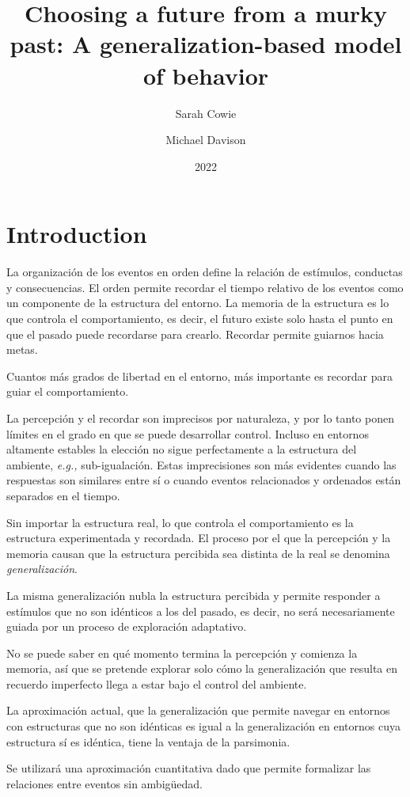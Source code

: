 \documentclass[a4paper,12pt]{article}
\title{Choosing a future from a murky past: A generalization-based model of behavior}
\author{Sarah Cowie \and Michael Davison}
\date{2022}
\begin{document}
{\scshape\bfseries \maketitle}

\section{Introduction}

La organización de los eventos en orden define la relación de estímulos, conductas y consecuencias. El orden permite recordar el tiempo relativo de los eventos como un componente de la estructura del entorno. La memoria de la estructura es lo que controla el comportamiento, es decir, el futuro existe solo hasta el punto en que el pasado puede recordarse para crearlo. Recordar permite guiarnos hacia metas.

Cuantos más grados de libertad en el entorno, más importante es recordar para guiar el comportamiento.

La percepción y el recordar son imprecisos por naturaleza, y por lo tanto ponen límites en el grado en que se puede desarrollar control. Incluso en entornos altamente estables la elección no sigue perfectamente a la estructura del ambiente, {\itshape e.g.,} sub-igualación. Estas imprecisiones son más evidentes cuando las respuestas son similares entre sí o cuando eventos relacionados y ordenados están separados en el tiempo.

Sin importar la estructura real, lo que controla el comportamiento es la estructura experimentada y recordada. El proceso por el que la percepción y la memoria causan que la estructura percibida sea distinta de la real se denomina {\itshape generalización}.

La misma generalización nubla la estructura percibida y permite responder a estímulos que no son idénticos a los del pasado, es decir, no será necesariamente guiada por un proceso de exploración adaptativo.

No se puede saber en qué momento termina la percepción y comienza la memoria, así que se pretende explorar solo cómo la generalización que resulta en recuerdo imperfecto llega a estar bajo el control del ambiente.

La aproximación actual, que la generalización que permite navegar en entornos con estructuras que no son idénticas es igual a la generalización en entornos cuya estructura sí es idéntica, tiene la ventaja de la parsimonia.

Se utilizará una aproximación cuantitativa dado que permite formalizar las relaciones entre eventos sin ambigüedad.
\end{document}
